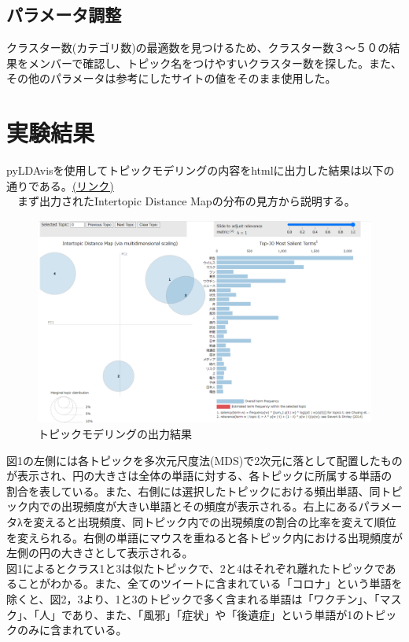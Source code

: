 \documentclass[a4paper, 11pt, titlepage]{jsarticle}
\begin{document}
\subsection{パラメータ調整}
クラスター数(カテゴリ数)の最適数を見つけるため、クラスター数３〜５０の結果をメンバーで確認し、トピック名をつけやすいクラスター数を探した。また、その他のパラメータは参考にしたサイトの値をそのまま使用した\cite{LDA}。

\section{実験結果}
pyLDAvisを使用してトピックモデリングの内容をhtmlに出力した結果は以下の通りである。\href{https://ie.u-ryukyu.ac.jp/~e205759/pyldavis_output.html}{(リンク)}\\
　まず出力されたIntertopic Distance Mapの分布の見方から説明する。\\
\begin{figure}[H]
  \centering 
  \includegraphics[scale=0.25]{picture1.png}
  \caption{トピックモデリングの出力結果}
\end{figure}
図1の左側には各トピックを多次元尺度法(MDS)で2次元に落として配置したものが表示され、円の大きさは全体の単語に対する、各トピックに所属する単語の割合を表している。また、右側には選択したトピックにおける頻出単語、同トピック内での出現頻度が大きい単語とその頻度が表示される。右上にあるパラメータλを変えると出現頻度、同トピック内での出現頻度の割合の比率を変えて順位を変えられる。右側の単語にマウスを重ねると各トピック内における出現頻度が左側の円の大きさとして表示される。\\
\newpage
図1によるとクラス1と3は似たトピックで、2と4はそれぞれ離れたトピックであることがわかる。また、全てのツイートに含まれている「コロナ」という単語を除くと、図2，3より、1と3のトピックで多く含まれる単語は「ワクチン」、「マスク」、「人」であり、また、「風邪」「症状」や「後遺症」という単語が1のトピックのみに含まれている。\\
\end{document}
